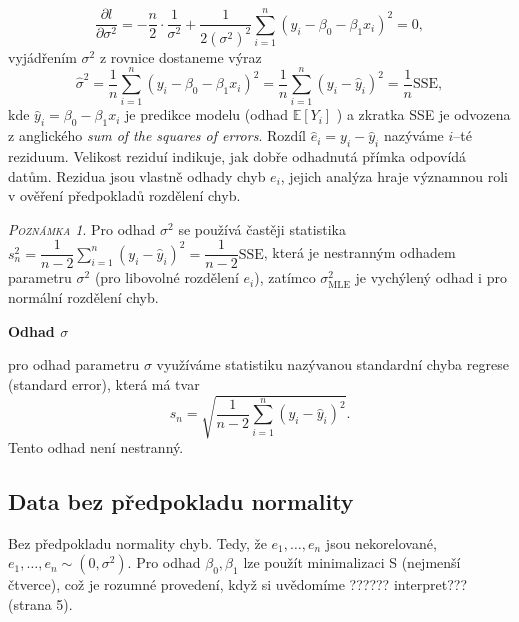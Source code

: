\documentclass[oneside,intlimits,reqno]{scrbook}
\theoremstyle{definition}
\theoremstyle{plain}
\theoremstyle{remark}
\newtheorem{remark}[define]{\textsc{Poznámka}}
\begin{document}
\begin{equation}
\frac{ \partial l}{ \partial \sigma^{2}} = -\frac{n}{2} \cdot \dfrac{1}{\sigma^{2}} + \dfrac{1}{2 (\sigma^{2})^{2}} \sum_{i=1}^{n} ( y_{i} -  \beta_{0}  - \beta_{1} x_{i})^{2} = 0,
\end{equation}
vyjádřením $ \sigma^{2} $ z rovnice dostaneme výraz
\begin{equation}
\widehat{\sigma}^{2} = \frac{1}{n} \sum_{i=1}^{n} ( y_{i} -  \beta_{0}  - \beta_{1} x_{i})^{2} = \frac{1}{n} \sum_{i=1}^{n} ( y_{i} -  \widehat{y}_{i})^{2} = \dfrac{1}{n} \text{SSE},
\end{equation}
kde $ \widehat{y}_{i} = \beta_{0}  - \beta_{1} x_{i} $ je predikce modelu (odhad $ \mathbb{E} [ Y_{i} ] $ ) a  zkratka SSE je odvozena z anglického \textit{sum of the squares of errors}. Rozdíl $ \widehat{e}_{i} = y_{i} -  \widehat{y}_{i} $ nazýváme $ i $--té reziduum. Velikost reziduí indikuje, jak dobře odhadnutá přímka odpovídá datům. Rezidua jsou vlastně odhady chyb $ e_{i} $,  jejich analýza hraje významnou roli v ověření předpokladů rozdělení chyb.

\begin{remark}
Pro odhad $ \sigma^{2} $ se používá častěji statistika $ s^{2}_{n} = \dfrac{1}{n - 2} \sum_{i=1}^{n}(y_{i} -  \widehat{y}_{i})^{2} = \dfrac{1}{n-2} \text{SSE} $, která je nestranným odhadem parametru $ \sigma^{2} $ (pro libovolné rozdělení $ e_{i} $), zatímco $ \sigma^{2}_{\text{MLE}} $ je vychýlený odhad i pro normální rozdělení chyb.
\end{remark}
\textbf{Odhad $ \sigma $}

pro odhad parametru $ \sigma $ využíváme statistiku nazývanou standardní chyba regrese (standard error), která má tvar
\begin{equation}
 s_{n} = \sqrt{\dfrac{1}{n-2} \sum_{i=1}^{n}(y_{i} -  \widehat{y}_{i})^{2}}.
\end{equation}
Tento odhad není nestranný.

\subsection{Data bez předpokladu normality}
Bez předpokladu normality chyb. Tedy, že $ e_{1}, \dots , e_{n} $ jsou nekorelované, $ e_{1}, \dots , e_{n} \sim (0,\sigma^{2}) $.
Pro odhad $ \beta_{0}, \beta_{1} $ lze použít minimalizaci S (nejmenší čtverce), což je rozumné provedení, když si uvědomíme ?????? interpret??? (strana 5).
\end{document}
